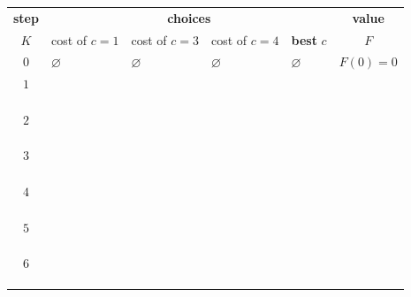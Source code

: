 \documentclass[a4paper]{article}
\begin{document}
\begin{center}
  \begin{tabular}{|c|p{}|p{}|p{}|l|c|}
    \hline
    \textbf{step} &
    \multicolumn{4}{|c|}{\textbf{choices}} &
    \textbf{value}
    \\
    $K$ &
    cost of $c=1$ &
    cost of $c=3$ &
    cost of $c=4$ &
    \textbf{best} $c$ &
    $F$ \\
    \hline
    $0$ &
    $\varnothing$ &
    $\varnothing$ &
    $\varnothing$ &
    $\varnothing$ &
    $F(0) = 0$
    \\
    \hline
    $1$ & & & & & \\ & & & & & \\ & & & & & \\ & & & & & \\
    \hline
    $2$ & & & & & \\ & & & & & \\ & & & & & \\ & & & & & \\
    \hline
    $3$ & & & & & \\ & & & & & \\ & & & & & \\ & & & & & \\
    \hline
    $4$ & & & & & \\ & & & & & \\ & & & & & \\ & & & & & \\
    \hline
    $5$ & & & & & \\ & & & & & \\ & & & & & \\ & & & & & \\
    \hline
    $6$ & & & & & \\ & & & & & \\ & & & & & \\ & & & & & \\
    \hline
  \end{tabular}
\end{center}
\end{document}
